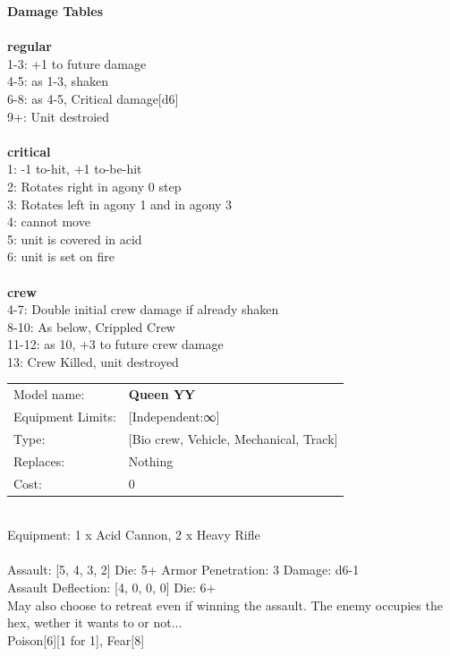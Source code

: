 {\bf Damage Tables} \\
\ \\ {\bf regular } \\
1-3: +1 to future damage \\
4-5: as 1-3, shaken \\
6-8: as 4-5, Critical damage[d6] \\
9+: Unit destroied \\
\ \\ {\bf critical } \\
1: -1 to-hit, +1 to-be-hit \\
2: Rotates right in agony 0 step \\
3: Rotates left in agony 1 and in agony 3 \\
4: cannot move \\
5: unit is covered in acid \\
6: unit is set on fire \\
\ \\ {\bf crew } \\
4-7: Double initial crew damage if already shaken \\
8-10: As below, Crippled Crew \\
11-12: as 10, +3 to future crew damage \\
13: Crew Killed, unit destroyed \\


\noindent
\begin{tabular}{ll}
Model name: &{\bf Queen YY } \\
Equipment Limits: &[Independent:∞] \\
Type: &[Bio crew, Vehicle, Mechanical, Track] \\
Replaces: &Nothing \\
Cost: & 0\\
\end{tabular}
\ \\
Equipment: 1 x Acid Cannon, 2 x Heavy Rifle \\
\ \\
Assault: [5, 4, 3, 2] Die: 5+ Armor Penetration: 3 Damage: d6-1 \\
Assault Deflection: [4, 0, 0, 0] Die: 6+\\
\indent May also choose to retreat even if winning the assault. The enemy occupies the hex, wether it wants to or not...\\ 
Poison[6][1 for 1], Fear[8]\\ 
 
